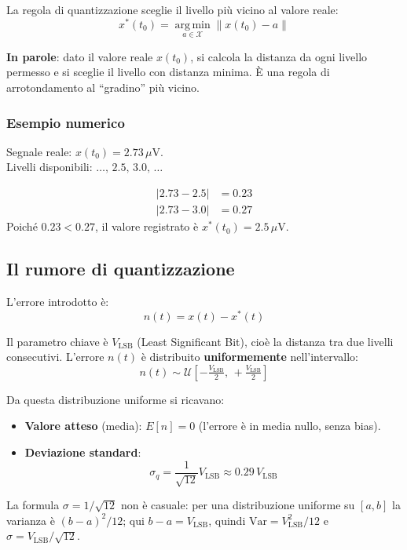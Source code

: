 \documentclass[12pt,a4paper]{article}
\begin{document}
La regola di quantizzazione sceglie il livello più vicino al valore reale:
\begin{equation}
  x^*(t_0) = \operatorname*{arg\,min}_{a \in \mathcal{X}} \|x(t_0) - a\|
\end{equation}

\textbf{In parole}: dato il valore reale $x(t_0)$, si calcola la distanza da ogni livello permesso
e si sceglie il livello con distanza minima. È una regola di arrotondamento al ``gradino'' più vicino.

\subsubsection*{Esempio numerico}
Segnale reale: $x(t_0) = 2.73\,\mu\text{V}$.\\
Livelli disponibili: $\ldots,\, 2.5,\, 3.0,\, \ldots$

\begin{align*}
  |2.73 - 2.5| &= 0.23 \\
  |2.73 - 3.0| &= 0.27
\end{align*}
Poiché $0.23 < 0.27$, il valore registrato è $x^*(t_0) = 2.5\,\mu\text{V}$.

\subsection{Il rumore di quantizzazione}

L'errore introdotto è:
\[
  n(t) = x(t) - x^*(t)
\]

Il parametro chiave è $V_{\text{LSB}}$ (Least Significant Bit), cioè la distanza tra due livelli
consecutivi. L'errore $n(t)$ è distribuito \textbf{uniformemente} nell'intervallo:
\[
  n(t) \sim \mathcal{U}\!\left[-\tfrac{V_{\text{LSB}}}{2},\, +\tfrac{V_{\text{LSB}}}{2}\right]
\]

Da questa distribuzione uniforme si ricavano:
\begin{itemize}
  \item \textbf{Valore atteso} (media): $E[n] = 0$ (l'errore è in media nullo, senza bias).
  \item \textbf{Deviazione standard}:
    \begin{equation}
      \sigma_q = \frac{1}{\sqrt{12}} V_{\text{LSB}} \approx 0.29\, V_{\text{LSB}}
    \end{equation}
\end{itemize}

La formula $\sigma = 1/\sqrt{12}$ non è casuale: per una distribuzione uniforme su $[a, b]$
la varianza è $(b-a)^2/12$; qui $b - a = V_{\text{LSB}}$, quindi
$\text{Var} = V_{\text{LSB}}^2/12$ e $\sigma = V_{\text{LSB}}/\sqrt{12}$.
\end{document}
